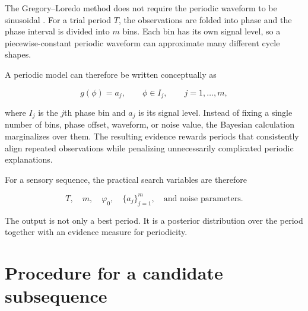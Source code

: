 \documentclass[a4paper]{article}
\begin{document}
The Gregory--Loredo method does not require the periodic waveform to be sinusoidal \citep{gregory-1992-a-new-method-for-the-detection-of-a-periodic-signal-of-unknown-shape-and-period}. For a trial period $T$, the observations are folded into phase and the phase interval is divided into $m$ bins. Each bin has its own signal level, so a piecewise-constant periodic waveform can approximate many different cycle shapes.

A periodic model can therefore be written conceptually as

\begin{equation}
g(\phi)
=
a_j,
\qquad
\phi\in I_j,
\qquad
j=1,\ldots,m,
\end{equation}

where $I_j$ is the $j$th phase bin and $a_j$ is its signal level. Instead of fixing a single number of bins, phase offset, waveform, or noise value, the Bayesian calculation marginalizes over them. The resulting evidence rewards periods that consistently align repeated observations while penalizing unnecessarily complicated periodic explanations.

For a sensory sequence, the practical search variables are therefore

\begin{equation}
T,\quad m,\quad \varphi_0,\quad \{a_j\}_{j=1}^{m},\quad \text{and noise parameters}.
\end{equation}

The output is not only a best period. It is a posterior distribution over the period together with an evidence measure for periodicity.

\section{Procedure for a candidate subsequence}
\end{document}
